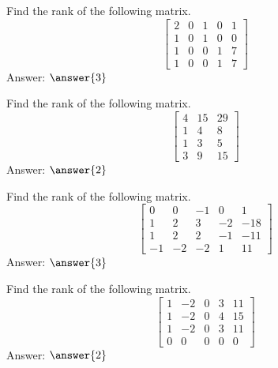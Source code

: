 \documentclass{ximera}
\begin{document}
\begin{problem}\label{prb:2.48} Find the rank of the following matrix.
\begin{equation*}
\left[
\begin{array}{rrrrr}
2 & 0 & 1 & 0 & 1 \\
1 & 0 & 1 & 0 & 0 \\
1 & 0 & 0 & 1 & 7 \\
1 & 0 & 0 & 1 & 7
\end{array}
\right]
\end{equation*}
Answer: $\answer{3}$
\end{problem}

\begin{problem}\label{prb:2.49} Find the rank of the following matrix.
\begin{equation*}
\left[
\begin{array}{rrr}
4 & 15 & 29 \\
1 & 4 & 8 \\
1 & 3 & 5 \\
3 & 9 & 15
\end{array}
\right]
\end{equation*}
Answer: $\answer{2}$
\end{problem}

\begin{problem}\label{prb:2.50} Find the rank of the following matrix.
\begin{equation*}
\left[
\begin{array}{rrrrr}
0 & 0 & -1 & 0 & 1 \\
1 & 2 & 3 & -2 & -18 \\
1 & 2 & 2 & -1 & -11 \\
-1 & -2 & -2 & 1 & 11
\end{array}
\right]
\end{equation*}
Answer: $\answer{3}$
\end{problem}

\begin{problem}\label{prb:2.51} Find the rank of the following matrix.
\begin{equation*}
\left[
\begin{array}{rrrrr}
1 & -2 & 0 & 3 & 11 \\
1 & -2 & 0 & 4 & 15 \\
1 & -2 & 0 & 3 & 11 \\
0 & 0 & 0 & 0 & 0
\end{array}
\right]
\end{equation*}
Answer: $\answer{2}$
\end{problem}
\end{document}
